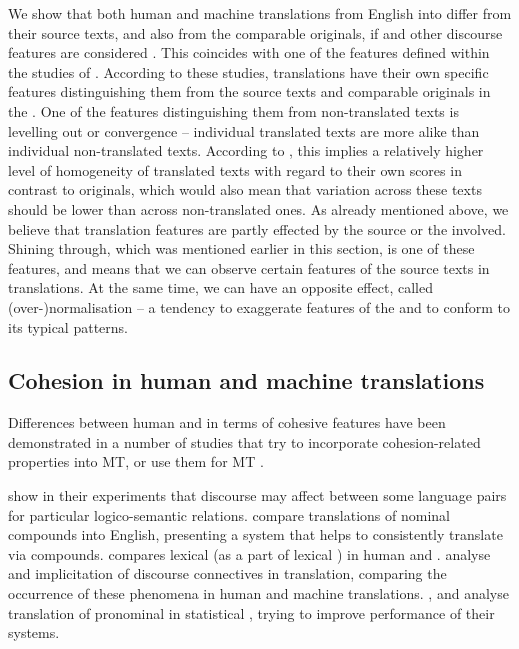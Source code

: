 \documentclass[output=paper]{langsci/langscibook.cls}
\begin{document}
We show that both human and machine translations from English into  differ from their source texts, and also from the comparable  originals, if  and other discourse features are considered \citep{Lapshinova2015Disco} . This coincides with one of the features defined within the studies of  \citep[see][]{Gellerstam:1986,Baker1993}. According to these studies, translations have their own specific features distinguishing them from the source texts and comparable originals in the . One of the features distinguishing them from non-translated texts is {\sc levelling out} or {\sc convergence} \citep{Laviosa:2002} -- individual translated texts are more alike than individual non-translated texts. According to \citet{Laviosa:2002}, this implies a relatively higher level of homogeneity of translated texts with regard to their own scores in contrast to originals, which would also mean that variation across these texts should be lower than across non-translated ones.
As already mentioned above, we believe that translation features are partly effected by the source or the  involved. Shining through, which was mentioned earlier in this section, is one of these features, and means that we can observe certain features of the source texts in translations. At the same time, we can have an opposite effect, called (over-){\sc normalisation} -- a tendency to exaggerate features of the  and to conform to its typical patterns.

\subsection{Cohesion in human and machine translations}\label{sec:cohesionHTMT}
\largerpage
Differences between human and  in terms of cohesive features have been demonstrated in a number of studies that try to incorporate cohesion-related properties into MT, or use them for MT .
 
 \newpage 
\citet{LiEtAl2014ACL} show in their experiments that discourse  may affect  between some language pairs for particular logico-semantic relations. \citet{MascarellEtAl2014} compare translations of  nominal compounds into English, presenting a system that helps to consistently translate  via compounds.  \citet{Guillou2013} compares lexical  (as a part of lexical ) in human and . \citet{MeyerWebber2013} analyse  and implicitation of discourse connectives in translation, comparing the occurrence of these phenomena in human and machine translations. \citet{Hardmeier2012discourse}, \citet{Guillou2012} and \citet{Hardmeier2014} analyse translation of pronominal  in statistical , trying to improve performance of their systems.
\end{document}
